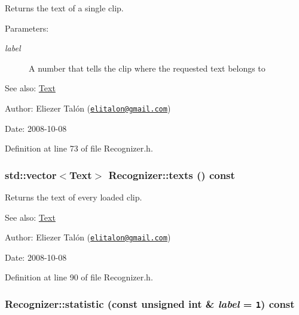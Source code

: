 Returns the text of a single clip. 

\begin{Desc}
\item[Parameters:]
\begin{description}
\item[{\em label}]A number that tells the clip where the requested text belongs to\end{description}
\end{Desc}
\begin{Desc}
\item[See also:]\hyperlink{class_text}{Text}\end{Desc}
\begin{Desc}
\item[Author:]Eliezer Talón (\href{mailto:elitalon@gmail.com}{\tt elitalon@gmail.com}) \end{Desc}
\begin{Desc}
\item[Date:]2008-10-08 \end{Desc}


Definition at line 73 of file Recognizer.h.\hypertarget{class_recognizer_6f3142f487a85cc4a6259cd5f8b8d7ba}{
\subsubsection[texts]{\setlength{\rightskip}{0pt plus 5cm}std::vector$<${\bf Text}$>$ Recognizer::texts () const}}
\label{class_recognizer_6f3142f487a85cc4a6259cd5f8b8d7ba}


Returns the text of every loaded clip. 

\begin{Desc}
\item[See also:]\hyperlink{class_text}{Text}\end{Desc}
\begin{Desc}
\item[Author:]Eliezer Talón (\href{mailto:elitalon@gmail.com}{\tt elitalon@gmail.com}) \end{Desc}
\begin{Desc}
\item[Date:]2008-10-08 \end{Desc}


Definition at line 90 of file Recognizer.h.\hypertarget{class_recognizer_7fd7d8cb29549f884b68f80628a6b8c9}{
\subsubsection[statistic]{ Recognizer::statistic (const unsigned int \& {\em label} = {\tt 1}) const}}
\label{class_recognizer_7fd7d8cb29549f884b68f80628a6b8c9}


